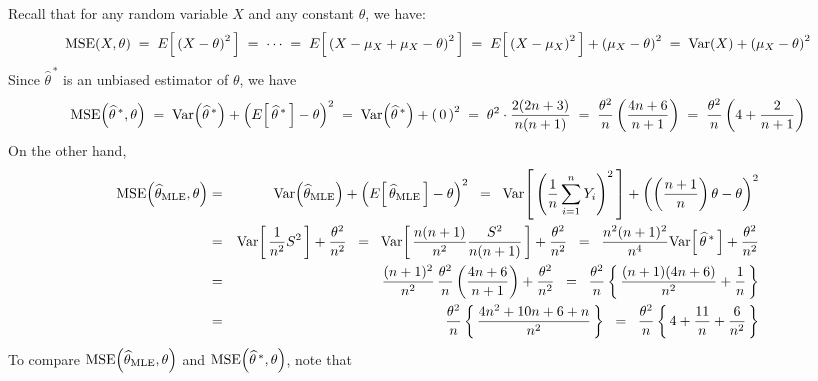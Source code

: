 Recall that for any random variable $X$ and any constant $\theta$, we have:
\begin{equation*}
\textnormal{MSE}(X,\theta)
\;=\; E\!\left[\,\left(X - \theta\right)^{2}\,\right]
\;=\; \cdots
\;=\; E\!\left[\,\left(X - \mu_{X} + \mu_{X} - \theta\right)^{2}\,\right]
\;=\; E\!\left[\,\left(X - \mu_{X}\right)^{2}\,\right] + \left(\mu_{X} - \theta\right)^{2}
\;=\; \textnormal{Var}(X) + \left(\mu_{X} - \theta\right)^{2}
\end{equation*}
Since $\widehat{\theta}^{\,*}$ is an unbiased estimator of $\theta$, we have
\begin{equation*}
\textnormal{MSE}\!\left(\widehat{\theta}^{\,*},\theta\right)
\;=\; \textnormal{Var}\!\left(\widehat{\theta}^{\,*}\right) + \left(E\!\left[\,\widehat{\theta}^{\,*}\,\right] - \theta\right)^{2}
\;=\; \textnormal{Var}\!\left(\widehat{\theta}^{\,*}\right) + \left(\,0\,\right)^{2}
\;=\; \theta^{2}\cdot\frac{2(2n+3)}{n(n+1)}
\;=\; \dfrac{\theta^{2}}{n}\left(\frac{4n+6}{n+1}\right)
\;=\; \dfrac{\theta^{2}}{n}\left(4 + \frac{2}{n+1}\right)
\end{equation*}
On the other hand,
\begin{eqnarray*}
\textnormal{MSE}\!\left(\widehat{\theta}_{\textnormal{MLE}},\theta\right)
&=& \textnormal{Var}\!\left(\widehat{\theta}_{\textnormal{MLE}}\right) + \left(E\!\left[\,\widehat{\theta}_{\textnormal{MLE}}\,\right] - \theta\right)^{2}
\;\;=\;\; \textnormal{Var}\!\left[\,\left(\dfrac{1}{n}\sum^{n}_{i=1}Y_{i}\right)^{2}\,\right] + \left(\left(\dfrac{n+1}{n}\right)\theta - \theta\right)^{2} \\
&=& \textnormal{Var}\!\left[\,\dfrac{1}{n^{2}}S^{2}\,\right] + \dfrac{\theta^{2}}{n^{2}}
\;\;=\;\; \textnormal{Var}\!\left[\,\dfrac{n(n+1)}{n^{2}}\dfrac{S^{2}}{n(n+1)}\,\right] + \dfrac{\theta^{2}}{n^{2}}
\;\;=\;\; \dfrac{n^{2}(n+1)^{2}}{n^{4}}\textnormal{Var}\!\left[\,\widehat{\theta}^{\,*}\,\right] + \dfrac{\theta^{2}}{n^{2}} \\
&=& \dfrac{(n+1)^{2}}{n^{2}}\,\dfrac{\theta^{2}}{n}\left(\frac{4n+6}{n+1}\right) + \dfrac{\theta^{2}}{n^{2}}
\;\;=\;\; \dfrac{\theta^{2}}{n}\left\{\,\dfrac{(n+1)(4n+6)}{n^{2}} + \dfrac{1}{n}\,\right\} \\
&=& \dfrac{\theta^{2}}{n}\left\{\,\dfrac{4n^{2} + 10n + 6 + n}{n^{2}}\,\right\}
\;\;=\;\; \dfrac{\theta^{2}}{n}\left\{\,4 + \dfrac{11}{n} + \dfrac{6}{n^{2}}\,\right\}
\end{eqnarray*}
To compare $\textnormal{MSE}\!\left(\widehat{\theta}_{\textnormal{MLE}},\theta\right)$
and $\textnormal{MSE}\!\left(\widehat{\theta}^{\,*},\theta\right)$, note that
